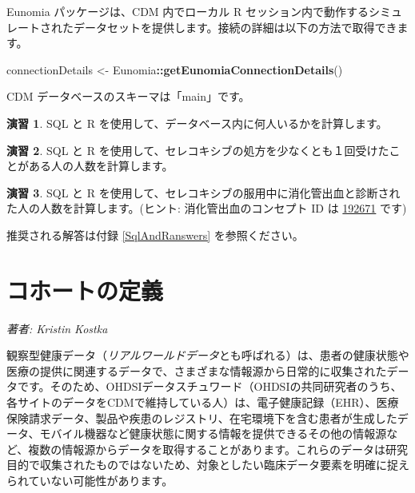 \documentclass[
  11pt]{book}
\newenvironment{Shaded}{\begin{snugshade}}{\end{snugshade}}
\newcommand{\FunctionTok}[1]{\textcolor[rgb]{0.13,0.29,0.53}{\textbf{#1}}}
\newcommand{\NormalTok}[1]{#1}
\newcommand{\OtherTok}[1]{\textcolor[rgb]{0.56,0.35,0.01}{#1}}
\newcommand{\SpecialCharTok}[1]{\textcolor[rgb]{0.81,0.36,0.00}{\textbf{#1}}}
\theoremstyle{definition}
\theoremstyle{definition}
\theoremstyle{definition}
\newtheorem{exercise}{演習}[chapter]
\theoremstyle{definition}
\theoremstyle{remark}
\begin{document}
Eunomia パッケージは、CDM 内でローカル R セッション内で動作するシミュレートされたデータセットを提供します。接続の詳細は以下の方法で取得できます。

\begin{Shaded}
\begin{Highlighting}[]
\NormalTok{connectionDetails }\OtherTok{\textless{}{-}}\NormalTok{ Eunomia}\SpecialCharTok{::}\FunctionTok{getEunomiaConnectionDetails}\NormalTok{()}
\end{Highlighting}
\end{Shaded}

CDM データベースのスキーマは「main」です。

\begin{exercise}
\protect\hypertarget{exr:exercisePeopleCount}{}\label{exr:exercisePeopleCount}SQL と R を使用して、データベース内に何人いるかを計算します。
\end{exercise}

\begin{exercise}
\protect\hypertarget{exr:exerciseCelecoxibUsers}{}\label{exr:exerciseCelecoxibUsers}SQL と R を使用して、セレコキシブの処方を少なくとも１回受けたことがある人の人数を計算します。
\end{exercise}

\begin{exercise}
\protect\hypertarget{exr:exerciseGiBleedsDuringCelecoxib}{}\label{exr:exerciseGiBleedsDuringCelecoxib}SQL と R を使用して、セレコキシブの服用中に消化管出血と診断された人の人数を計算します。(ヒント: 消化管出血のコンセプト ID は \href{http://athena.ohdsi.org/search-terms/terms/192671}{192671} です)
\end{exercise}

推奨される解答は付録 \ref{SqlAndRanswers} を参照ください。

\chapter{コホートの定義}\label{Cohorts}

\emph{著者: Kristin Kostka}

観察型健康データ（\emph{リアルワールドデータ}とも呼ばれる）は、患者の健康状態や医療の提供に関連するデータで、さまざまな情報源から日常的に収集されたデータです。そのため、OHDSIデータスチュワード（OHDSIの共同研究者のうち、各サイトのデータをCDMで維持している人）は、電子健康記録（EHR）、医療保険請求データ、製品や疾患のレジストリ、在宅環境下を含む患者が生成したデータ、モバイル機器など健康状態に関する情報を提供できるその他の情報源など、複数の情報源からデータを取得することがあります。これらのデータは研究目的で収集されたものではないため、対象としたい臨床データ要素を明確に捉えられていない可能性があります。
\end{document}
